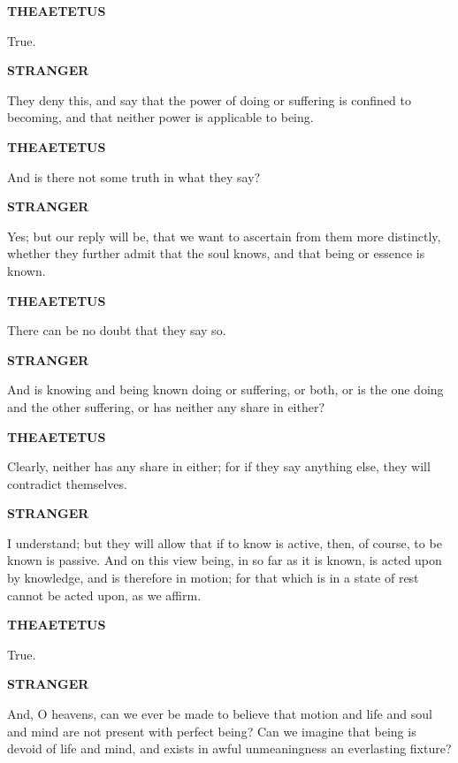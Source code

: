 \documentclass[11pt,letter]{article}
\begin{document}
\par \textbf{THEAETETUS}
\par   True.

\par \textbf{STRANGER}
\par   They deny this, and say that the power of doing or suffering is confined to becoming, and that neither power is applicable to being.

\par \textbf{THEAETETUS}
\par   And is there not some truth in what they say?

\par \textbf{STRANGER}
\par   Yes; but our reply will be, that we want to ascertain from them more distinctly, whether they further admit that the soul knows, and that being or essence is known.

\par \textbf{THEAETETUS}
\par   There can be no doubt that they say so.

\par \textbf{STRANGER}
\par   And is knowing and being known doing or suffering, or both, or is the one doing and the other suffering, or has neither any share in either?

\par \textbf{THEAETETUS}
\par   Clearly, neither has any share in either; for if they say anything else, they will contradict themselves.

\par \textbf{STRANGER}
\par   I understand; but they will allow that if to know is active, then, of course, to be known is passive. And on this view being, in so far as it is known, is acted upon by knowledge, and is therefore in motion; for that which is in a state of rest cannot be acted upon, as we affirm.

\par \textbf{THEAETETUS}
\par   True.

\par \textbf{STRANGER}
\par   And, O heavens, can we ever be made to believe that motion and life and soul and mind are not present with perfect being? Can we imagine that being is devoid of life and mind, and exists in awful unmeaningness an everlasting fixture?
\end{document}
